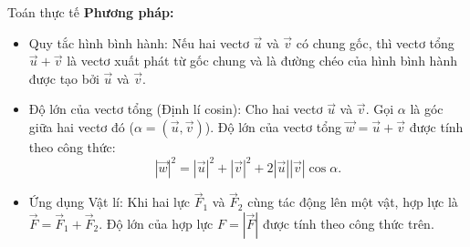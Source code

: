 \begin{dang}{Toán thực tế}
	\textbf{Phương pháp:}
	\begin{itemize}
		\item Quy tắc hình bình hành: Nếu hai vectơ $\overrightarrow{u}$ và $\overrightarrow{v}$ có chung gốc, thì vectơ tổng $\overrightarrow{u} + \overrightarrow{v}$ là vectơ xuất phát từ gốc chung và là đường chéo của hình bình hành được tạo bởi $\overrightarrow{u}$ và $\overrightarrow{v}$.
		\item	Độ lớn của vectơ tổng (Định lí cosin): Cho hai vectơ $\overrightarrow{u}$ và $\overrightarrow{v}$. Gọi $\alpha$ là góc giữa hai vectơ đó ($\alpha = (\overrightarrow{u}, \overrightarrow{v})$). Độ lớn của vectơ tổng $\overrightarrow{w} = \overrightarrow{u} + \overrightarrow{v}$ được tính theo công thức:
		$$
		\left|\overrightarrow{w}\right|^2 = \left|\overrightarrow{u}\right|^2 + \left|\overrightarrow{v}\right|^2 + 2\left|\overrightarrow{u}\right|\left|\overrightarrow{v}\right|\cos \alpha.
		$$
		\item  Ứng dụng Vật lí: Khi hai lực $\overrightarrow{F}_1$ và $\overrightarrow{F}_2$ cùng tác động lên một vật, hợp lực là $\overrightarrow{F} = \overrightarrow{F}_1 + \overrightarrow{F}_2$. Độ lớn của hợp lực $F = \left|\overrightarrow{F}\right|$ được tính theo công thức trên.
	\end{itemize}
\end{dang}
